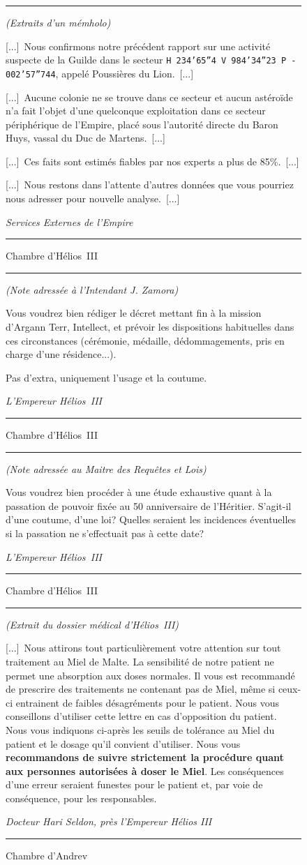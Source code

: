\documentclass{article}
\newcommand{\newcharacter}{\clearpage\setcounter{figure}{0}}
\newcommand{\indice}[4]{
  \begin{figure}[H]
    \begin{center}
      \rule{0.5\textwidth}{1pt}
    \end{center}
    \begin{framed}
      \begin{samepage}
        \textit{#1}
        \nopagebreak

        #2

        \nopagebreak

        \hfill\textit{#3}
      \end{samepage}
    \end{framed}
    \caption{#4}
    \begin{center}
      \rule{0.5\textwidth}{1pt}
    \end{center}
  \end{figure}
}
\begin{document}
\indice
{(Extraits d'un mémholo)}
{
    [...]~Nous confirmons notre précédent rapport sur une activité suspecte de
    la Guilde dans le secteur \mbox{\texttt{H 234'65''4 V 984'34''23 P -
    002'57''744}}, appelé Poussières du Lion.~[...]

    \nobreak

    [...]~Aucune colonie ne se trouve dans ce secteur et aucun astéroïde n'a
    fait l'objet d'une quelconque exploitation dans ce secteur périphérique de
    l'Empire, placé sous l'autorité directe du Baron Huys, vassal du Duc de
    Martens.~[...]

    \nobreak

    [...]~Ces faits sont estimés fiables par nos experts a plus de 85\%.~[...]

    \nobreak

    [...]~Nous restons dans l'attente d'autres données que vous pourriez nous
    adresser pour nouvelle analyse.~[...]
}{Services Externes de l'Empire}
{Chambre d'Hélios~III}

\indice
{(Note adressée à l'Intendant J. Zamora)}
{
    Vous voudrez bien rédiger le décret mettant fin à la mission d'Argann Terr,
    Intellect, et prévoir les dispositions habituelles dans ces circonstances
    (cérémonie, médaille, dédommagements, pris en charge d'une résidence...).

    \nobreak

    Pas d'extra, uniquement l'usage et la coutume.
}{L'Empereur Hélios~III}
{Chambre d'Hélios~III}

\indice
{(Note adressée au Maitre des Requêtes et Lois)}
{
    Vous voudrez bien procéder à une étude exhaustive quant à la passation de
    pouvoir fixée au 50\ieme{} anniversaire de l'Héritier. S'agit-il d'une
    coutume, d'une loi? Quelles seraient les incidences éventuelles si la
    passation ne s'effectuait pas à cette date?
}{L'Empereur Hélios~III}
{Chambre d'Hélios~III}

\newcharacter

\indice
{(Extrait du dossier médical d'Hélios~III)}
{
    [...]~Nous attirons tout particulièrement votre attention sur tout
    traitement au Miel de Malte. La sensibilité de notre patient ne permet une
    absorption aux doses normales. Il vous est recommandé de prescrire des
    traitements ne contenant pas de Miel, même si ceux-ci entrainent de faibles
    désagréments pour le patient. Nous vous conseillons d'utiliser cette lettre
    en cas d'opposition du patient. Nous vous indiquons ci-après les seuils de
    tolérance au Miel du patient et le dosage qu'il convient d'utiliser. Nous
    vous \textbf{recommandons de suivre strictement la procédure quant aux
    personnes autorisées à doser le Miel}. Les conséquences d'une erreur
    seraient funestes pour le patient et, par voie de conséquence, pour les
    responsables.
}{Docteur Hari Seldon, près l'Empereur Hélios III}
{Chambre d'Andrev}
\end{document}
